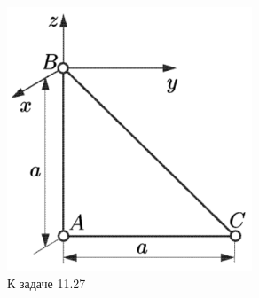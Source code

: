 \begin{figure}
\begin{minipage}[b]{0.35\textwidth}
            \includegraphics[width=0.65\textwidth]{figures/3.png}
            \caption{К задаче 11.27}
        \end{minipage}
\end{figure}


